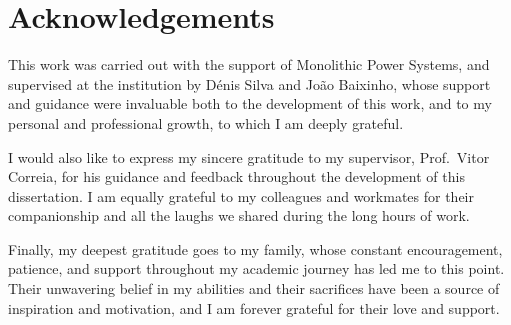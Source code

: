 \chapter*{Acknowledgements}

This work was carried out with the support of Monolithic Power Systems, and supervised at the institution by Dénis Silva and João Baixinho, whose support and guidance were invaluable both to the development of this work, and to my personal and professional growth, to which I am deeply grateful. 

I would also like to express my sincere gratitude to my supervisor, Prof.~Vitor Correia, for his guidance and feedback throughout the development of this dissertation. I am equally grateful to my colleagues and workmates for their companionship and all the laughs we shared during the long hours of work.

Finally, my deepest gratitude goes to my family, whose constant encouragement, patience, and support throughout my academic journey has led me to this point. Their unwavering belief in my abilities and their sacrifices have been a source of inspiration and motivation, and I am forever grateful for their love and support.

\vspace{10mm}
